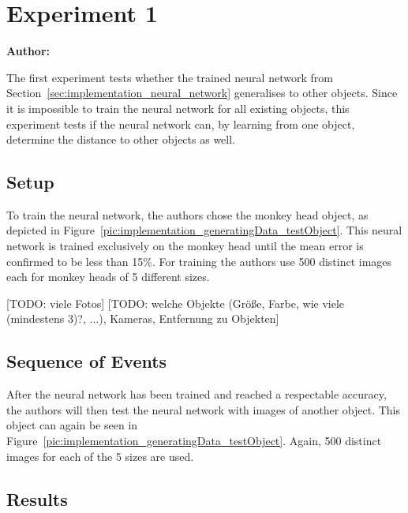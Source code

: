 \chapter{Experiment 1}

\textbf{Author: } 

The first experiment tests whether the trained neural network from Section~\ref{sec:implementation_neural_network} generalises to other objects. Since it is impossible to train the neural network for all existing objects, this experiment tests if the neural network can, by learning from one object, determine the distance to other objects as well.

\section{Setup}
To train the neural network, the authors chose the monkey head object, as depicted in Figure~\ref{pic:implementation_generatingData_testObject}. This neural network is trained exclusively on the monkey head until the mean error is confirmed to be less than 15\%. For training the authors use 500 distinct images each for monkey heads of 5 different sizes.

[TODO: viele Fotos]
[TODO: welche Objekte (Größe, Farbe, wie viele (mindestens 3)?, ...), Kameras, Entfernung zu Objekten]

\section{Sequence of Events}
After the neural network has been trained and reached a respectable accuracy, the authors will then test the neural network with images of another object. This object can again be seen in Figure~\ref{pic:implementation_generatingData_testObject}. Again, 500 distinct images for each of the 5 sizes are used.

\section{Results}

\filbreak
